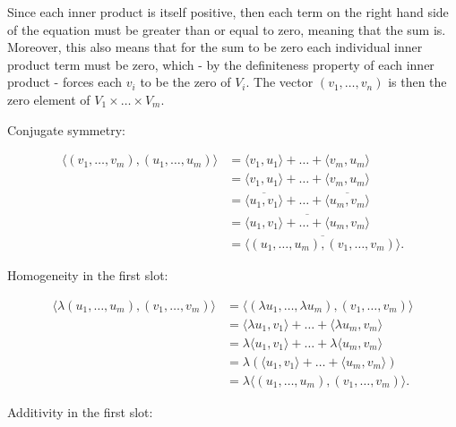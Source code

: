 \documentclass{book}
\begin{document}
\begin{enumerate}
Since each inner product is itself positive, then each term on the right hand side of the equation must be greater than or equal to zero, meaning that the sum is.  Moreover, this also means that for the sum to be zero each individual inner product term must be zero, which - by the definiteness property of each inner product - forces each \(v_i\) to be the zero of \(V_i\).  The vector \((v_1,\dots,v_n)\) is then the zero element of \(V_1 \times \dots \times V_m\).

Conjugate symmetry:

\begin{equation*}
    \begin{split}
        \langle (v_1,\dots,v_m),(u_1,\dots,u_m) \rangle &= \langle v_1,u_1 \rangle + \dots + \langle v_m,u_m \rangle \\
        &= \langle v_1,u_1 \rangle + \dots + \langle v_m,u_m \rangle \\
        &= \overline{\langle u_1,v_1 \rangle} + \dots + \overline{\langle u_m,v_m \rangle} \\
        &= \overline{\langle u_1,v_1 \rangle + \dots + \langle u_m,v_m \rangle} \\
        &= \overline{\langle (u_1,\dots,u_m),(v_1,\dots,v_m) \rangle}.
    \end{split}
\end{equation*}

Homogeneity in the first slot:

\begin{equation*}
    \begin{split}
        \langle \lambda(u_1,\dots,u_m),(v_1,\dots,v_m) \rangle &= \langle (\lambda u_1,\dots,\lambda u_m), (v_1,\dots,v_m) \rangle \\
        &= \langle \lambda u_1,v_1 \rangle + \dots + \langle \lambda u_m,v_m \rangle \\
        &= \lambda \langle u_1,v_1 \rangle + \dots + \lambda \langle u_m,v_m \rangle \\
        &= \lambda (\langle u_1,v_1 \rangle + \dots + \langle u_m,v_m \rangle) \\
        &= \lambda \langle (u_1,\dots,u_m),(v_1,\dots,v_m) \rangle.
    \end{split}
\end{equation*}

Additivity in the first slot:


\end{enumerate}
\end{document}
